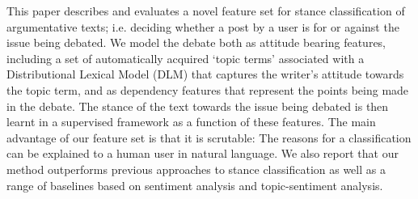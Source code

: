 This paper describes and evaluates a novel feature set for stance classification of argumentative texts; i.e. deciding whether a post by a user is for or against the issue being debated. We model the debate both as attitude bearing  features, including a set of automatically acquired `topic terms' associated with a Distributional Lexical Model (DLM) that captures the writer's attitude towards the topic term, and as dependency features that represent the points being made in the debate. The stance of the text towards the issue being debated is then learnt in a supervised framework as a function of these features. The main advantage of our feature set is that it is scrutable: The reasons for a classification can be explained to a human user in natural language. We also report that our method outperforms previous approaches to stance classification as well as a range of baselines based on sentiment analysis and topic-sentiment analysis.

